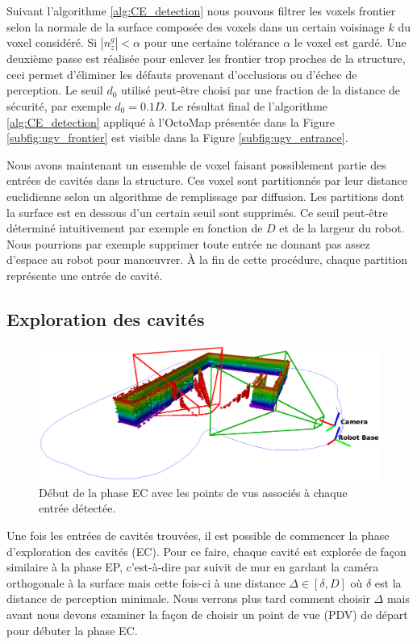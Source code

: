 Suivant l'algorithme \ref{alg:CE_detection} nous pouvons filtrer les voxels frontier selon la normale de la surface composée des voxels dans un certain voisinage $k$ du voxel considéré. Si $| n_z^g | < \alpha$ pour une certaine tolérance $\alpha$ le voxel est gardé. Une deuxième passe est réalisée pour enlever les frontier trop proches de la structure, ceci permet d'éliminer les défauts provenant d'occlusions ou d'échec de perception. Le seuil $d_0$ utilisé peut-être choisi par une fraction de la distance de sécurité, par exemple $d_0 = 0.1D$. Le résultat final de l'algorithme \ref{alg:CE_detection} appliqué à l'OctoMap présentée dans la Figure \ref{subfig:ugv_frontier} est visible dans la Figure \ref{subfig:ugv_entrance}.

Nous avons maintenant un ensemble de voxel faisant possiblement partie des entrées de cavités dans la structure. Ces voxel sont partitionnés par leur distance euclidienne selon un algorithme de remplissage par diffusion. Les partitions dont la surface est en dessous d'un certain seuil sont supprimés. Ce seuil peut-être déterminé intuitivement par exemple en fonction de $D$ et de la largeur du robot. Nous pourrions par exemple supprimer toute entrée ne donnant pas assez d'espace au robot pour man{\oe}uvrer. À la fin de cette procédure, chaque partition représente une entrée de cavité.

\subsection{Exploration des cavités}

\begin{figure}[ht]
  \centering
  \includegraphics[width=0.8\linewidth]{images/CE_start}
  \caption{Début de la phase EC avec les points de vus associés à chaque entrée détectée.}
  \label{ugv:debut_ec}
\end{figure}

Une fois les entrées de cavités trouvées, il est possible de commencer la phase d'exploration des cavités (EC). Pour ce faire, chaque cavité est explorée de façon similaire à la phase EP, c'est-à-dire par suivit de mur en gardant la caméra orthogonale à la surface mais cette fois-ci à une distance $\Delta \in [\delta, D]$ où $\delta$ est la distance de perception minimale. Nous verrons plus tard comment choisir $\Delta$ mais avant nous devons examiner la façon de choisir un point de vue (PDV) de départ pour débuter la phase EC.

